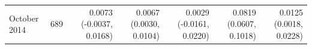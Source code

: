 \begin{tabular}{lrrrrrr}
October 2014 & 689 & 0.0073 (-0.0037, 0.0168) & 0.0067 (0.0030, 0.0104) & 0.0029 (-0.0161, 0.0220) & 0.0819 (0.0607, 0.1018) & 0.0125 (0.0018, 0.0228) \\

\end{tabular}
